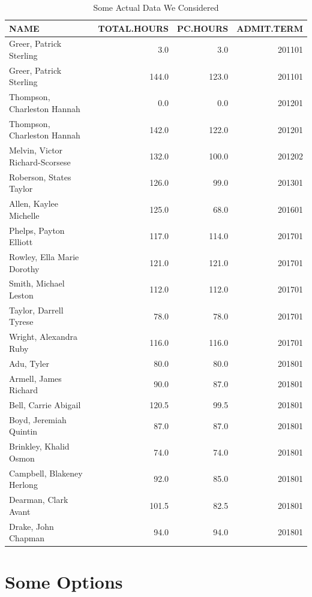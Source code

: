 \documentclass[
]{book}
\begin{document}
\begin{table}

\caption{\label{tab:unnamed-chunk-3}Some Actual Data We Considered}
\centering
\begin{tabular}[t]{l|r|r|r}
\hline
NAME & TOTAL.HOURS & PC.HOURS & ADMIT.TERM\\
\hline
Greer, Patrick Sterling & 3.0 & 3.0 & 201101\\
\hline
Greer, Patrick Sterling & 144.0 & 123.0 & 201101\\
\hline
Thompson, Charleston Hannah & 0.0 & 0.0 & 201201\\
\hline
Thompson, Charleston Hannah & 142.0 & 122.0 & 201201\\
\hline
Melvin, Victor Richard-Scorsese & 132.0 & 100.0 & 201202\\
\hline
Roberson, States Taylor & 126.0 & 99.0 & 201301\\
\hline
Allen, Kaylee Michelle & 125.0 & 68.0 & 201601\\
\hline
Phelps, Payton Elliott & 117.0 & 114.0 & 201701\\
\hline
Rowley, Ella Marie Dorothy & 121.0 & 121.0 & 201701\\
\hline
Smith, Michael Leston & 112.0 & 112.0 & 201701\\
\hline
Taylor, Darrell Tyrese & 78.0 & 78.0 & 201701\\
\hline
Wright, Alexandra Ruby & 116.0 & 116.0 & 201701\\
\hline
Adu, Tyler & 80.0 & 80.0 & 201801\\
\hline
Armell, James Richard & 90.0 & 87.0 & 201801\\
\hline
Bell, Carrie Abigail & 120.5 & 99.5 & 201801\\
\hline
Boyd, Jeremiah Quintin & 87.0 & 87.0 & 201801\\
\hline
Brinkley, Khalid Osmon & 74.0 & 74.0 & 201801\\
\hline
Campbell, Blakeney Herlong & 92.0 & 85.0 & 201801\\
\hline
Dearman, Clark Avant & 101.5 & 82.5 & 201801\\
\hline
Drake, John Chapman & 94.0 & 94.0 & 201801\\
\hline
\end{tabular}
\end{table}

\hypertarget{some-options}{%
\chapter{Some Options}\label{some-options}}
\end{document}
